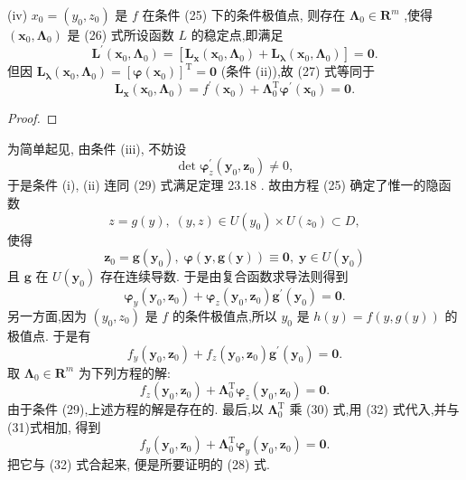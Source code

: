 (iv) \({x}_{0} = \left( {{y}_{0},{z}_{0}}\right)\) 是 \(f\) 在条件 (25) 下的条件极值点, 则存在 \({\mathbf{\Lambda }}_{0} \in  {\mathbf{R}}^{m}\) ,使得 \(\left( {{\mathbf{x}}_{0},{\mathbf{\Lambda }}_{0}}\right)\) 是 (26) 式所设函数 \(L\) 的稳定点,即满足
\[
{\mathbf{L}}^{\prime }\left( {{\mathbf{x}}_{0},{\mathbf{\Lambda }}_{0}}\right)  = \left\lbrack  {{\mathbf{L}}_{\mathbf{x}}\left( {{\mathbf{x}}_{0},{\mathbf{\Lambda }}_{0}}\right)  + {\mathbf{L}}_{\mathbf{\lambda }}\left( {{\mathbf{x}}_{0},{\mathbf{\Lambda }}_{0}}\right) }\right\rbrack   = \mathbf{0}. \tag{27}
\]
但因 \({\mathbf{L}}_{\mathbf{\lambda }}\left( {{\mathbf{x}}_{0},{\mathbf{\Lambda }}_{0}}\right)  = {\left\lbrack  \mathbf{\varphi }\left( {\mathbf{x}}_{0}\right) \right\rbrack  }^{\mathrm{T}} = \mathbf{0}\) (条件 (ii)),故 (27) 式等同于
\[
{\mathbf{L}}_{\mathbf{x}}\left( {{\mathbf{x}}_{0},{\mathbf{\Lambda }}_{0}}\right)  = {f}^{\prime }\left( {\mathbf{x}}_{0}\right)  + {\mathbf{\Lambda }}_{0}^{\mathrm{T}}{\mathbf{\varphi }}^{\prime }\left( {\mathbf{x}}_{0}\right)  = \mathbf{0}. \tag{28}
\]
\begin{proof}

\end{proof}
为简单起见, 由条件 (iii), 不妨设
\[
\det {\mathbf{\varphi }}_{z}^{\prime }\left( {{\mathbf{y}}_{0},{\mathbf{z}}_{0}}\right)  \neq  0, \tag{29}
\]
于是条件 (i), (ii) 连同 (29) 式满足定理 23.18 . 故由方程 (25) 确定了惟一的隐函数
\[
z = g\left( y\right) ,\;\left( {y,z}\right)  \in  U\left( {y}_{0}\right)  \times  U\left( {z}_{0}\right)  \subset  D,
\]
使得
\[
{\mathbf{z}}_{0} = \mathbf{g}\left( {\mathbf{y}}_{0}\right) ,\;\mathbf{\varphi }\left( {\mathbf{y},\mathbf{g}\left( \mathbf{y}\right) }\right)  \equiv  \mathbf{0},\;\mathbf{y} \in  U\left( {\mathbf{y}}_{0}\right)
\]
且 \(\mathbf{g}\) 在 \(U\left( {\mathbf{y}}_{0}\right)\) 存在连续导数. 于是由复合函数求导法则得到
\[
{\mathbf{\varphi }}_{y}\left( {{\mathbf{y}}_{0},{\mathbf{z}}_{0}}\right)  + {\mathbf{\varphi }}_{z}\left( {{\mathbf{y}}_{0},{\mathbf{z}}_{0}}\right) {\mathbf{g}}^{\prime }\left( {\mathbf{y}}_{0}\right)  = \mathbf{0}. \tag{30}
\]
另一方面,因为 \(\left( {{y}_{0},{z}_{0}}\right)\) 是 \(f\) 的条件极值点,所以 \({y}_{0}\) 是 \(h\left( y\right)  = f\left( {y,g\left( y\right) }\right)\) 的极值点. 于是有
\[
{f}_{y}\left( {{\mathbf{y}}_{0},{\mathbf{z}}_{0}}\right)  + {f}_{z}\left( {{\mathbf{y}}_{0},{\mathbf{z}}_{0}}\right) {\mathbf{g}}^{\prime }\left( {\mathbf{y}}_{0}\right)  = \mathbf{0}. \tag{31}
\]
取 \({\mathbf{\Lambda }}_{0} \in  {\mathbf{R}}^{m}\) 为下列方程的解:
\[
{f}_{z}\left( {{\mathbf{y}}_{0},{\mathbf{z}}_{0}}\right)  + {\mathbf{\Lambda }}_{0}^{\mathrm{T}}{\mathbf{\varphi }}_{z}\left( {{\mathbf{y}}_{0},{\mathbf{z}}_{0}}\right)  = \mathbf{0}. \tag{32}
\]
由于条件 (29),上述方程的解是存在的. 最后,以 \({\mathbf{\Lambda }}_{0}^{\mathrm{T}}\) 乘 (30) 式,用 (32) 式代入,并与 (31)式相加, 得到
\[
{f}_{y}\left( {{\mathbf{y}}_{0},{\mathbf{z}}_{0}}\right)  + {\mathbf{\Lambda }}_{0}^{\mathrm{T}}{\mathbf{\varphi }}_{y}\left( {{\mathbf{y}}_{0},{\mathbf{z}}_{0}}\right)  = \mathbf{0}.
\]
把它与 (32) 式合起来, 便是所要证明的 (28) 式.

